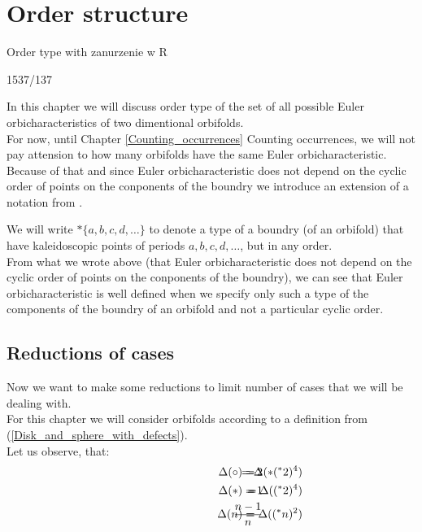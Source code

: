 \chapter{Order structure}

Order type with zanurzenie w R

1537/137

In this chapter we will discuss order type of the set of all possible Euler orbicharacteristics 
of two dimentional orbifolds. \\
For now, until Chapter \ref{Counting_occurrences} Counting occurrences, we will not pay attension 
to how many orbifolds have the same Euler orbicharacteristic. \\ 
Because of that and since Euler orbicharacteristic does not depend on the cyclic order 
of points on the conponents of the boundry we introduce an extension of a notation from 
\cite{Conway2008}. 


We will write $*\{a,b,c,d,\dots\}$ to denote a type of a boundry (of an orbifold) that have 
kaleidoscopic points of periods $a,b,c,d,\dots$, but in any order. \\


From what we wrote above (that Euler orbicharacteristic does not depend on the cyclic order 
of points on the conponents of the boundry), we can see that Euler 
orbicharacteristic is well defined 
when we specify only such a type of the components of the boundry of an orbifold and not 
a particular cyclic order.  \\

\section{Reductions of cases}
Now we want to make some reductions to limit number of cases that we will be dealing with. \\
For this chapter we will consider orbifolds according to a definition from 
(\ref{Disk_and_sphere_with_defects}). \\
Let us observe, that:
\begin{align*}
\hspace{3cm}\Delta(\circ) =& \hspace{-1cm} &-2& \hspace{-1cm} &= \Delta(*(^*2)^4) \\
\hspace{3cm}\Delta(*) =& \hspace{-1cm} &-1& \hspace{-1cm} &= \Delta((^*2)^4) \\
\hspace{3cm}\Delta(n) =& \hspace{-1cm} &\frac{n-1}{n}& \hspace{-1cm} &= \Delta((^*n)^2)
\end{align*}

